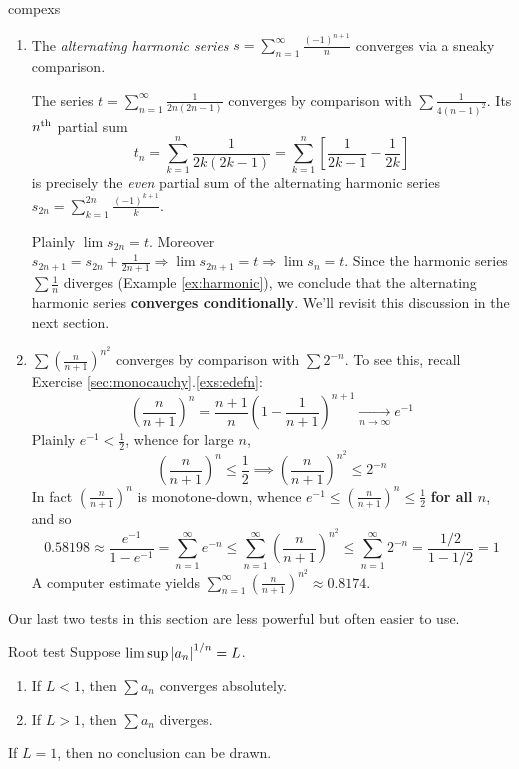 \begin{examples}{}{compexs}
\begin{enumerate}
	  
	  
	  \item\label{ex:altharmonic1} The \emph{alternating harmonic series} $s=\sum_{n=1}^\infty\frac{(-1)^{n+1}}n$ converges via a sneaky comparison.\par
	  The series $t=\sum_{n=1}^\infty \frac 1{2n(2n-1)}$ converges by comparison with $\sum\frac 1{4(n-1)^2}$. Its $n\textsuperscript{th}$ partial sum
	  \[
	  	t_n=\sum_{k=1}^{n}\frac 1{2k(2k-1)}
	  	=\sum_{k=1}^n\left[\frac 1{2k-1}-\frac 1{2k}\right]
	  \]
	  is precisely the \emph{even} partial sum of the alternating harmonic series $s_{2n}=\sum_{k=1}^{2n}\frac{(-1)^{k+1}}k$.\par
	  Plainly $\lim s_{2n}=t$. Moreover $s_{2n+1}=s_{2n}+\frac 1{2n+1}\Longrightarrow \lim s_{2n+1}=t \Longrightarrow \lim s_n=t$. Since the harmonic series $\sum\frac 1n$ diverges (Example \ref{ex:harmonic}), we conclude that the alternating harmonic series \textbf{converges conditionally}. We'll revisit this discussion in the next section.
	  

		\item\label{ex:root5} $\sum\left(\frac n{n+1}\right)^{n^2}$ converges by comparison with $\sum 2^{-n}$. To see this, recall Exercise \ref*{sec:monocauchy}.\ref{exs:edefn}:
		\[
			\left(\frac n{n+1}\right)^n
			=\frac{n+1}n\left(1-\frac 1{n+1}\right)^{n+1}
			\xrightarrow[n\to\infty]{}
			e^{-1}
		\]
		Plainly $e^{-1}<\frac 12$, whence for large $n$,
		\[
			\left(\frac n{n+1}\right)^n\le\frac 12
			\implies 
			\left(\frac n{n+1}\right)^{n^2}\le 2^{-n}
		\]
		In fact $\left(\frac n{n+1}\right)^n$ is monotone-down, whence $e^{-1}\le \left(\frac n{n+1}\right)^n\le \frac 12$ \textbf{for all $n$}, and so
		\[
			0.58198\approx \frac{e^{-1}}{1-e^{-1}}
			=\sum_{n=1}^\infty e^{-n}
			\le \sum_{n=1}^\infty\left(\frac n{n+1}\right)^{n^2}
			\le \sum_{n=1}^\infty 2^{-n}
			=\frac{1/2}{1-1/2}=1
		\]
		A computer estimate yields $\sum\limits_{n=1}^\infty\left(\frac n{n+1}\right)^{n^2}\approx 0.8174$.
	\end{enumerate}
\end{examples}


\goodbreak


Our last two tests in this section are less powerful but often easier to use.


\begin{thm}{Root test}{}
	Suppose $\limsup\left| a_n\right|^{1/n}=L$.
	\begin{enumerate}
		\item If $L<1$, then $\sum a_n$ converges absolutely.
		\item If $L>1$, then $\sum a_n$ diverges.
	\end{enumerate}
	If $L=1$, then no conclusion can be drawn.
\end{thm}

